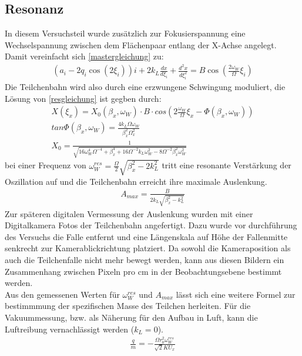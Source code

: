 \documentclass[a4paper,12pt]{article}
\begin{document}
\subsection{Resonanz}
In diesem Versuchsteil wurde zusätzlich zur Fokusierspannung  eine Wechselspannung zwischen dem Flächenpaar entlang der X-Achse angelegt. Damit vereinfacht sich \ref{mastergleichung} zu: 
\begin{align*}\label{resgleichung}
	\left( a_i -2q_i \cos\left( 2\xi_i \right) \right) i  + 2k_L \frac{dx}{d\xi_i} + \frac{d^2x}{d\xi_i^2} = B\cos\left( \frac{2ω_W}{Ω}ξ_i \right)
\end{align*}
Die Teilchenbahn wird also durch eine erzwungene Schwingung moduliert, die Lösung von \ref{resgleichung} ist gegben durch:
\begin{align*}\label{resgleichung}
	X(\xi_x) = X_0( \beta_x,\omega_W ) \cdot B \cdot cos(2\frac{\omega_W}{\Omega}\xi_x - \Phi(\beta_x,\omega_W))
	\\
	 tan\Phi(\beta_x,\omega_W) = \frac{4 k_L \Omega \omega_W}{\beta_x^{2}\Omega_x^{2}} 
	 \\
	  X_0 = \frac{1}{\sqrt{16\omega^{4}_W\Omega^{-4}+\beta^{4}_x+16\Omega^{-2}k_L\omega^{2}_W-8\Omega^{-2}\beta^{2}_x\omega^{2}_W}}
\end{align*}
bei einer Frequenz von $\omega^{res}_W = \frac{\Omega}{2}\sqrt{\beta^{2}_x-2k^{2}_L} $ tritt eine resonante 
Verstärkung der Oszillation auf und die Teilchenbahn erreicht ihre maximale Auslenkung.
\begin{align*}\label{Amax}
	A_{max} = \frac{B}{2k_L\sqrt{\beta^{2}_x-k^{2}_L}}
\end{align*}
Zur späteren digitalen Vermessung der Auslenkung wurden mit einer Digitalkamera Fotos der Teilchenbahn angefertigt.
Dazu wurde vor durchführung des Versuchs die Falle entfernt und eine Längenskala auf Höhe der Fallenmitte senkrecht zur Kamerablickrichtung platziert.  
Da sowohl die Kameraposition als auch die Teilchenfalle nicht mehr bewegt werden, kann aus diesen Bildern ein Zusammenhang zwischen Pixeln pro cm in der Beobachtungsebene 
bestimmt werden.
\\
Aus den gemessenen Werten für $\omega^{res}_W$ und $A_{max}$ lässt sich eine weitere Formel zur bestimmmung der spezifischen Masse des Teilchen herleiten. 
Für die Vakuummessung, bzw. als Näherung für den Aufbau in Luft, kann die Luftreibung vernachlässigt werden ($k_L = 0$).  
\begin{align*}\label{resspezm}
	\frac{q}{m} = -\frac{\Omega r^{2}_0 \omega^{res}_W}{\sqrt{2} K U_x}
\end{align*}
\end{document}
